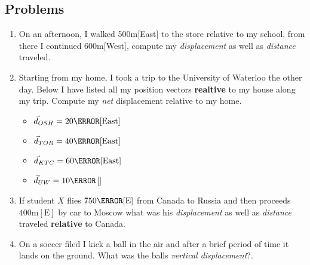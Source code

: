 \documentclass[12pt]{article}
\newcommand{\tx}[1]{\text{#1}}
\theoremstyle{break}
\begin{document}
\subsection{Problems}
\begin{enumerate}
    \item On an afternoon, I walked 500m[East] to the store relative to my school, from there I continued
        600m[West], compute my \emph{displacement} as well as \emph{distance} traveled.
        \vspace*{4cm}
    \item Starting from my home, I took a trip to the University of Waterloo the other day. Below I have listed all my position vectors 
            \textbf{realtive} to my house along my trip. Compute my \emph{net} displacement relative to my home.
        \begin{itemize}
            \item $\vec d_{OSH}= 20\km[\tx{East}]$
            \item $\vec d_{TOR} = 40\km[\tx{East}]$
            \item $\vec d_{KTC} = 60\km[\tx{East}]$
            \item $\vec d_{UW} = 10\m $[\tx{West}]
        \end{itemize}
        \vspace*{5cm}
    \item If student $X$ flies $750\km[\tx{E}]$ from Canada to Russia and then proceeds $400\tx{m}[\tx{E}]$ by car
        to Moscow what was his \emph{displacement} as well as \emph{distance} traveled \textbf{relative} to Canada.
        \vspace*{4cm}
    \item On a soccer filed I kick a ball in the air and after a brief period of time it lands on
        the ground. What was the balls \emph{vertical displacement}?. 
\end{enumerate}
\end{document}
